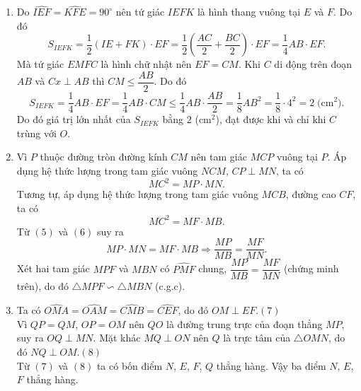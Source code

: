 \begin{bt}
{\begin{enumerate}
\begin{center}
\end{center}	
\item Do $\widehat{IEF}=\widehat{KFE}=90^\circ$ nên tứ giác $IEFK$ là hình thang vuông tại $E$ và $F$. Do đó 
\[S_{IEFK}=\dfrac{1}{2}\left(IE+FK\right)\cdot EF=\dfrac{1}{2}\left(\dfrac{AC}{2}+\dfrac{BC}{2}\right)\cdot EF=\dfrac{1}{4}AB\cdot EF.\]
Mà tứ giác $EMFC$ là hình chữ nhật nên $EF=CM$. Khi $C$ di động trên đoạn $AB$ và $Cx\perp AB$ thì $CM\le \dfrac{AB}{2}$. Do đó
\[S_{IEFK}=\dfrac{1}{4}AB\cdot EF=\dfrac{1}{4}AB\cdot CM\le \dfrac{1}{4}AB\cdot \dfrac{AB}{2}=\dfrac{1}{8}AB^2=\dfrac{1}{8}\cdot 4^2=2\;\text{(cm$^2$)}.\]
Do đó giá trị lớn nhất của $S_{IEFK}$ bằng $2$ (cm$^2$), đạt được khi và chỉ khi $C$ trùng với $O$.
\item Vì $P$ thuộc đường tròn đường kính $CM$ nên tam giác $MCP$ vuông tại $P$. Áp dụng hệ thức lượng trong tam giác vuông $NCM$, $CP\perp MN$, ta có \[MC^2=MP\cdot MN.\tag{5}\]
Tương tự, áp dụng hệ thức lượng trong tam giác vuông $MCB$, đường cao $CF$, ta có \[MC^2=MF\cdot MB.\tag{6}\]
Từ $(5)$ và $(6)$ suy ra \[MP\cdot MN=MF\cdot MB\Rightarrow \dfrac{MP}{MB}=\dfrac{MF}{MN}.\]
Xét hai tam giác $MPF$ và $MBN$ có $\widehat{PMF}$ chung, $\dfrac{MP}{MB}=\dfrac{MF}{MN}$ (chứng minh trên), do đó $\triangle MPF\backsim\triangle MBN$ (c.g.c).
\item Ta có $\widehat{OMA}=\widehat{OAM}=\widehat{CMB}=\widehat{CEF}$, do đó $OM\perp EF$.\hfill$(7)$\\
Vì $QP=QM$, $OP=OM$ nên $QO$ là đường trung trực của đoạn thẳng $MP$, suy ra $OQ\perp MN$. Mặt khác $MQ\perp ON$ nên $Q$ là trực tâm của $\triangle OMN$, do đó $NQ\perp OM$.\hfill$(8)$\\
Từ $(7)$ và $(8)$ ta có bốn điểm $N$, $E$, $F$, $Q$ thẳng hàng. Vậy ba điểm $N$, $E$, $F$ thẳng hàng.
\end{enumerate}
}
\end{bt}
